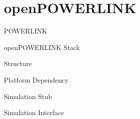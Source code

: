 \section{openPOWERLINK}
\begin{frame}{POWERLINK}
\end{frame}

\begin{frame}{openPOWERLINK Stack}
\end{frame}

\begin{frame}{Structure}
\end{frame}

\begin{frame}{Platform Dependency}
\end{frame}

\begin{frame}{Simulation Stub}
\end{frame}

\begin{frame}{Simulation Interface}
\end{frame}